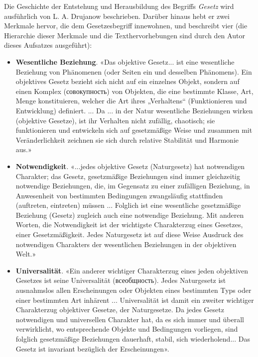 \documentclass[11pt,a4paper]{article}
\begin{document}
Die Geschichte der Entstehung und Herausbildung des Begriffs \emph{Gesetz}
wird ausführlich von L. A. Drujanow beschrieben. Darüber hinaus hebt er zwei
Merkmale hervor, die dem Gesetzesbegriff innewohnen, und beschreibt vier (die
Hierarchie dieser Merkmale und die Texthervorhebungen sind durch den Autor
dieses Aufsatzes ausgeführt):
\begin{itemize}
\item \textbf{Wesentliche Beziehung}. «Das objektive Gesetz... ist eine
  wesentliche Beziehung von Phänomenen (oder Seiten ein und desselben
  Phänomens). Ein objektives Gesetz bezieht sich nicht auf ein einzelnes
  Objekt, sondern auf einen Komplex (\foreignlanguage{russian}{совокупность})
  von Objekten, die eine bestimmte Klasse, Art, Menge konstituieren, welcher
  die Art ihres „Verhaltens“ (Funktionieren und Entwicklung) definiert.
  ... Da ... in der Natur wesentliche Beziehungen wirken (objektive Gesetze),
  ist ihr Verhalten nicht zufällig, chaotisch; sie funktionieren und
  entwickeln sich auf gesetzmäßige Weise und zusammen mit Veränderlichkeit
  zeichnen sie sich durch relative Stabilität und Harmonie aus.»
\item \textbf{Notwendigkeit}. «...jedes objektive Gesetz (Naturgesetz) hat
  notwendigen Charakter; das Gesetz, gesetzmäßige Beziehungen sind immer
  gleichzeitig notwendige Beziehungen, die, im Gegensatz zu einer zufälligen
  Beziehung, in Anwesenheit von bestimmten Bedingungen zwangsläufig
  stattfinden (auftreten, eintreten) müssen ...  Folglich ist eine wesentliche
  gesetzmäßige Beziehung (Gesetz) zugleich auch eine notwendige Beziehung.
  Mit anderen Worten, die Notwendigkeit ist der wichtigste Charakterzug eines
  Gesetzes, einer Gesetzmäßigkeit. Jedes Naturgesetz ist auf diese Weise
  Ausdruck des notwendigen Charakters der wesentlichen Beziehungen in der
  objektiven Welt.»
\item \textbf{Universalität}. «Ein anderer wichtiger Charakterzug eines jeden
  objektiven Gesetzes ist seine Universalität
  (\foreignlanguage{russian}{всеобщность}). Jedes Naturgesetz ist ausnahmslos
  allen Erscheinungen oder Objekten eines bestimmten Typs oder einer
  bestimmten Art inhärent ...  Universalität ist damit ein zweiter wichtiger
  Charakterzug objektiver Gesetze, der Naturgesetze.  Da jedes Gesetz
  notwendigen und universellen Charakter hat, da es sich immer und überall
  verwirklicht, wo entsprechende Objekte und Bedingungen vorliegen, sind
  folglich gesetzmäßige Beziehungen dauerhaft, stabil, sich wiederholend...
  Das Gesetz ist invariant bezüglich der Erscheinungen».

\end{itemize}
\end{document}
